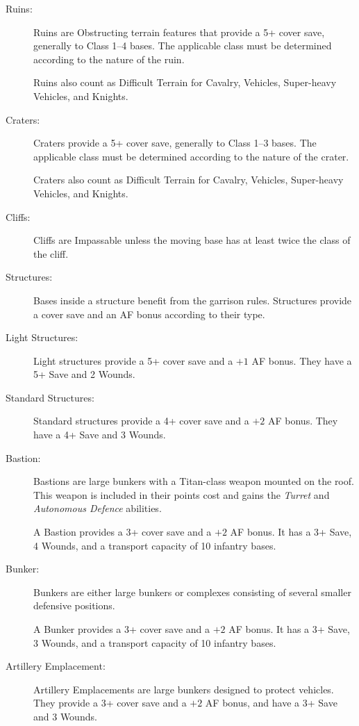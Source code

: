\begin{description}
    \item[Ruins:] Ruins are Obstructing terrain features that provide a 5+ cover save, generally to Class 1--4 bases. The applicable class must be determined according to the nature of the ruin.

    Ruins also count as Difficult Terrain for Cavalry, Vehicles, Super-heavy Vehicles, and Knights.

    \item[Craters:] Craters provide a 5+ cover save, generally to Class 1--3 bases. The applicable class must be determined according to the nature of the crater.

    Craters also count as Difficult Terrain for Cavalry, Vehicles, Super-heavy Vehicles, and Knights.

    \item[Cliffs:] Cliffs are Impassable unless the moving base has at least twice the class of the cliff.

    \item[Structures:] Bases inside a structure benefit from the garrison rules. Structures provide a cover save and an AF bonus according to their type.

    \item[Light Structures:] Light structures provide a 5+ cover save and a $+1$ AF bonus. They have a 5+ Save and 2 Wounds.

    \item[Standard Structures:] Standard structures provide a 4+ cover save and a $+2$ AF bonus. They have a 4+ Save and 3 Wounds.

    \item[Bastion:] Bastions are large bunkers with a Titan-class weapon mounted on the roof. This weapon is included in their points cost and gains the \textit{Turret} and \textit{Autonomous Defence} abilities.

    A Bastion provides a 3+ cover save and a $+2$ AF bonus. It has a 3+ Save, 4 Wounds, and a transport capacity of 10 infantry bases.

    \item[Bunker:] Bunkers are either large bunkers or complexes consisting of several smaller defensive positions.

    A Bunker provides a 3+ cover save and a $+2$ AF bonus. It has a 3+ Save, 3 Wounds, and a transport capacity of 10 infantry bases.

    \item[Artillery Emplacement:] Artillery Emplacements are large bunkers designed to protect vehicles. They provide a 3+ cover save and a $+2$ AF bonus, and have a 3+ Save and 3 Wounds.


\end{description}
